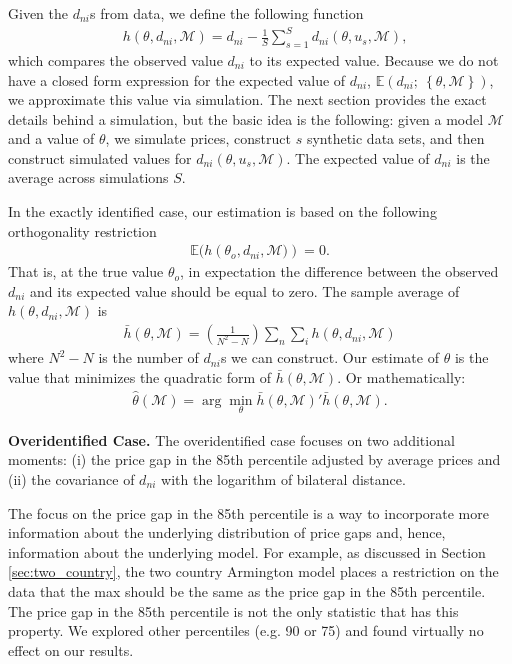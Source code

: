 \documentclass[12pt,dvips, ps2pdf]{article}
\begin{document}
Given the $d_{ni}$s from data, we define the following function
\begin{align}
&h(\theta,d_{ni},\mathcal{M}) = d_{ni} - \frac{1}{S}\sum_{s=1}^{S}d_{ni}(\theta,u_s,\mathcal{M}),
\end{align}
which compares the observed value $d_{ni}$ to its expected value. Because we do not have a closed form expression for the expected value of $d_{ni}$, $\mathbb{E}(d_{ni}; \ \left\{\theta,{\mathcal{M}}\right\})$, we approximate this value via simulation. The next section provides the exact details behind a simulation, but the basic idea is the following: given a model $\mathcal{M}$ and a value of $\theta$, we simulate prices, construct $s$ synthetic data sets, and then construct simulated values for $d_{ni}(\theta,u_s,\mathcal{M})$. The expected value of $d_{ni}$ is the average across simulations $S$.

In the exactly identified case, our estimation is based on the following orthogonality restriction
\begin{align}
\mathbb{E}(h\left(\theta_o,d_{ni},\mathcal{M})\right) = 0.
\end{align}
That is, at the true value $\theta_o$, in expectation the difference between the observed $d_{ni}$ and its expected value should be equal to zero. The sample average of $h(\theta,d_{ni},\mathcal{M})$ is
\begin{align}
\label{eq:g_exact}
\bar{h}(\theta,\mathcal{M}) = \left(\frac{1}{N^2-N}\right)\sum_{n}\sum_{i}h(\theta,d_{ni},\mathcal{M})
\end{align}
where $N^2-N$ is the number of $d_{ni}$s we can construct. Our estimate of $\theta$ is the value that minimizes the quadratic form of $\bar{h}(\theta,\mathcal{M})$. Or mathematically:
\begin{align}
\hat \theta (\mathcal{M}) = \arg\min_{\theta} \bar{h}(\theta,\mathcal{M})'\bar{h}(\theta,\mathcal{M}).
\label{eq:quad_form_exact}
\end{align}

\textbf{Overidentified Case.} The overidentified case focuses on two additional moments: (i) the price gap in the 85th percentile adjusted by average prices and (ii) the covariance of $d_{ni}$ with the logarithm of bilateral distance.

The focus on the price gap in the 85th percentile is a way to incorporate more information about the underlying distribution of price gaps and, hence, information about the underlying model. For example, as discussed in Section \ref{sec:two_country}, the two country Armington model places a restriction on the data that the max should be the same as the price gap in the 85th percentile. The price gap in the 85th percentile is not the only statistic that has this property. We explored other percentiles (e.g. 90 or 75) and found virtually no effect on our results.
\end{document}
